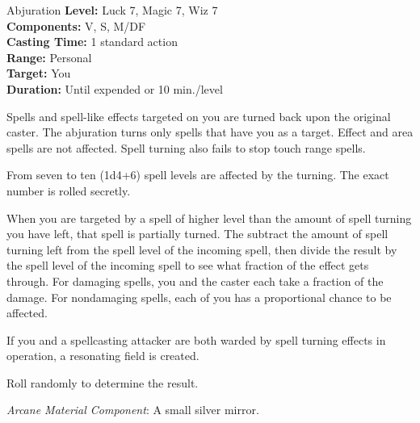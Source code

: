 {Abjuration}
{
	\textbf{Level:}
	Luck 7, Magic 7, Wiz 7\\
	\textbf{Components:}
	V, S, M/DF\\
	\textbf{Casting Time:}
	1 standard action\\
	\textbf{Range:}
	Personal\\
	\textbf{Target:}
	You\\
	\textbf{Duration:}
	Until expended or 10 min./level\\
}
{
	Spells and spell-like effects targeted on you are turned back upon the original caster. The abjuration turns only spells that have you as a target. Effect and area spells are not affected. Spell turning also fails to stop touch range spells.

	From seven to ten (1d4+6) spell levels are affected by the turning. The exact number is rolled secretly.

	When you are targeted by a spell of higher level than the amount of spell turning you have left, that spell is partially turned. The subtract the amount of spell turning left from the spell level of the incoming spell, then divide the result by the spell level of the incoming spell to see what fraction of the effect gets through. For damaging spells, you and the caster each take a fraction of the damage. For nondamaging spells, each of you has a proportional chance to be affected.

	If you and a spellcasting attacker are both warded by spell turning effects in operation, a resonating field is created.

	Roll randomly to determine the result.


	\textit{Arcane Material Component}:
	A small silver mirror.

}
